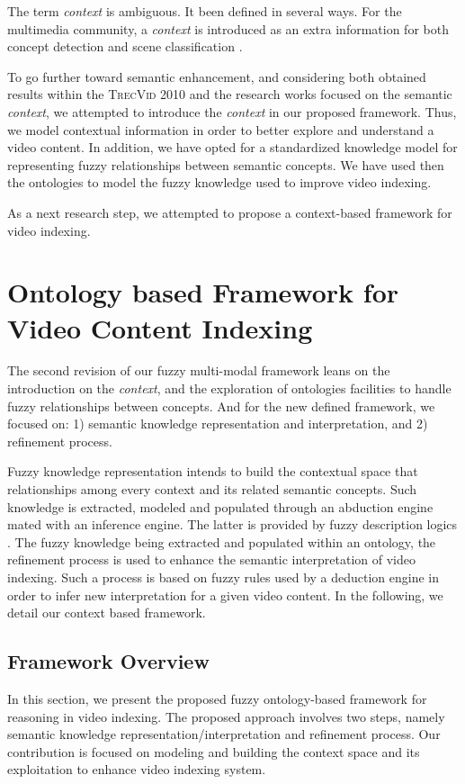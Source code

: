 		The term \emph{context} is ambiguous. It  been defined in several ways. For the multimedia 
		community, a \emph{context} is introduced as an extra information for both concept detection 
		and scene classification \citep{Mylonas2005,Torralba2010}.

		To go further toward semantic enhancement, and considering both obtained results within 
		the \textsc{TrecVid 2010} and the research works focused on the semantic \emph{context}, 
		we attempted to introduce the \emph{context} in our proposed framework. Thus, we model 
		contextual information in order to better explore and understand a video content.
		In addition, we have opted for a standardized knowledge model for representing fuzzy relationships between
		semantic concepts. We have used then the ontologies 
		to model the fuzzy knowledge used to improve video indexing.
		
		As a next research step, we attempted to propose a context-based framework for video indexing.

	\section{Ontology based Framework for Video Content Indexing}
	\label{c1_2}

		The second revision of our fuzzy multi-modal framework leans on the introduction on the 
		\emph{context}, and the exploration of ontologies facilities to handle fuzzy relationships 
		between concepts. And for the new defined framework, we focused on: 1) semantic knowledge 
		representation and interpretation, and 2)  refinement process.

		Fuzzy knowledge representation intends to build the contextual space that  relationships 
		among every context and its related semantic concepts. Such knowledge is extracted, modeled 
		and populated through an abduction engine mated with an inference engine. The latter is 
		provided by fuzzy description logics \citep{Straccia2006,Mantaras2015}. The fuzzy knowledge
		being extracted and populated within an ontology, the refinement process is used to enhance 
		the semantic interpretation of video indexing. Such a process is based on fuzzy rules used by 
		a deduction engine in order to infer new interpretation for a given  video content.
		In the following, we detail our context based framework.

			\subsection{Framework Overview}
			In this section, we present the proposed fuzzy ontology-based framework 
			for reasoning in video indexing. The proposed approach involves two steps, 
			namely semantic knowledge representation/interpretation and refinement process.
			Our contribution is focused on modeling and building the context space and its 
			exploitation to enhance video indexing system.

